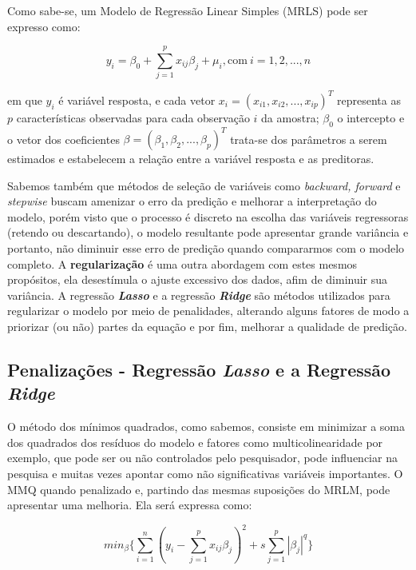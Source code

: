 \documentclass[
]{book}
\begin{document}
Como sabe-se, um Modelo de Regressão Linear Simples (MRLS) pode ser expresso como:

\begin{equation}
    y_i=\beta_0+\displaystyle \sum^p_{j=1}x_{ij}\beta_j+\mu_i, \mbox{com} \ i=1,2,...,n
\end{equation}

em que \(y_i\) é variável resposta, e cada vetor \(x_i=(x_{i1},x_{i2},...,x_{ip})^T\) representa as \(p\) características observadas para cada observação \(i\) da amostra; \(\beta_0\) o intercepto e o vetor dos coeficientes \(\beta=(\beta_1,\beta_2,...,\beta_p)^T\) trata-se dos parâmetros a serem estimados e estabelecem a relação entre a variável resposta e as preditoras.

Sabemos também que métodos de seleção de variáveis como \emph{backward, forward} e \emph{stepwise} buscam amenizar o erro da predição e melhorar a interpretação do modelo, porém visto que o processo é discreto na escolha das variáveis regressoras (retendo ou descartando), o modelo resultante pode apresentar grande variância e portanto, não diminuir esse erro de predição quando compararmos com o modelo completo. A \textbf{regularização} é uma outra abordagem com estes mesmos propósitos, ela desestímula o ajuste excessivo dos dados, afim de diminuir sua variância. A regressão \textbf{\emph{Lasso}} e a regressão \textbf{\emph{Ridge}} são métodos utilizados para regularizar o modelo por meio de penalidades, alterando alguns fatores de modo a priorizar (ou não) partes da equação e por fim, melhorar a qualidade de predição.

\hypertarget{penalizacoes}{%
\subsection{\texorpdfstring{Penalizações - Regressão \emph{Lasso} e a Regressão \emph{Ridge}}{Penalizações - Regressão Lasso e a Regressão Ridge}}\label{penalizacoes}}

O método dos mínimos quadrados, como sabemos, consiste em minimizar a soma dos quadrados dos resíduos do modelo e fatores como multicolinearidade por exemplo, que pode ser ou não controlados pelo pesquisador, pode influenciar na pesquisa e muitas vezes apontar como não significativas variáveis importantes. O MMQ quando penalizado e, partindo das mesmas suposições do MRLM, pode apresentar uma melhoria. Ela será expressa como:

\begin{equation}
    min_\beta \bigg\{\displaystyle \sum^n_{i=1}(y_i-\displaystyle \sum^p_{j=1}x_{ij}\beta_j)^2+s\displaystyle \sum^p_{j=1}|\beta_j|^q\bigg\}
    \label{eq:penalizacao}
\end{equation}
\end{document}
